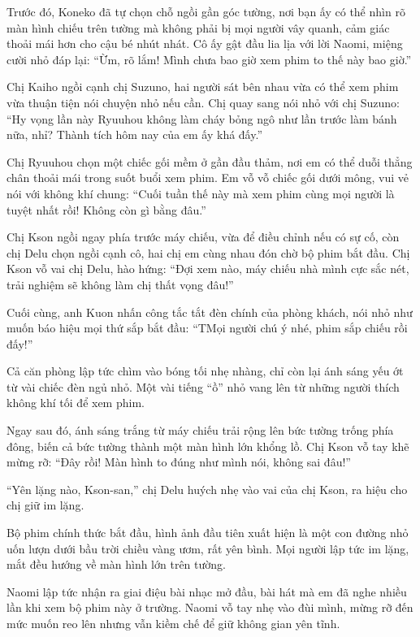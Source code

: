 \documentclass[../main.tex]{subfiles}
\begin{document}
Trước đó, Koneko đã tự chọn chỗ ngồi gần góc tường, nơi bạn ấy có thể nhìn rõ màn hình chiếu trên tường mà không phải bị mọi người vây quanh, cảm giác thoải mái hơn cho cậu bé nhút nhát. Cô ấy gật đầu lia lịa với lời Naomi, miệng cười nhỏ đáp lại: ``Ừm, rõ lắm! Mình chưa bao giờ xem phim to thế này bao giờ.''

Chị Kaiho ngồi cạnh chị Suzuno, hai người sát bên nhau vừa có thể xem phim vừa thuận tiện nói chuyện nhỏ nếu cần. Chị quay sang nói nhỏ với chị Suzuno: ``Hy vọng lần này Ryuuhou không làm cháy bỏng ngô như lần trước làm bánh nữa, nhỉ? Thành tích hôm nay của em ấy khá đấy.''

Chị Ryuuhou chọn một chiếc gối mềm ở gần đầu thảm, nơi em có thể duỗi thẳng chân thoải mái trong suốt buổi xem phim. Em vỗ vỗ chiếc gối dưới mông, vui vẻ nói với không khí chung: ``Cuối tuần thế này mà xem phim cùng mọi người là tuyệt nhất rồi! Không còn gì bằng đâu.''

Chị Kson ngồi ngay phía trước máy chiếu, vừa để điều chỉnh nếu có sự cố, còn chị Delu chọn ngồi cạnh cô, hai chị em cùng nhau đón chờ bộ phim bắt đầu. Chị Kson vỗ vai chị Delu, hào hứng: ``Đợi xem nào, máy chiếu nhà mình cực sắc nét, trải nghiệm sẽ không làm chị thất vọng đâu!''

Cuối cùng, anh Kuon nhấn công tắc tắt đèn chính của phòng khách, nói nhỏ như muốn báo hiệu mọi thứ sắp bắt đầu: ``TMọi người chú ý nhé, phim sắp chiếu rồi đấy!''

Cả căn phòng lập tức chìm vào bóng tối nhẹ nhàng, chỉ còn lại ánh sáng yếu ớt từ vài chiếc đèn ngủ nhỏ. Một vài tiếng ``ồ'' nhỏ vang lên từ những người thích không khí tối để xem phim.

Ngay sau đó, ánh sáng trắng từ máy chiếu trải rộng lên bức tường trống phía đông, biến cả bức tường thành một màn hình lớn khổng lồ. Chị Kson vỗ tay khẽ mừng rỡ: ``Đây rồi! Màn hình to đúng như mình nói, không sai đâu!''

``Yên lặng nào, Kson-san,'' chị Delu huých nhẹ vào vai của chị Kson, ra hiệu cho chị giữ im lặng.

Bộ phim chính thức bắt đầu, hình ảnh đầu tiên xuất hiện là một con đường nhỏ uốn lượn dưới bầu trời chiều vàng ươm, rất yên bình. Mọi người lập tức im lặng, mắt đều hướng về màn hình lớn trên tường.

Naomi lập tức nhận ra giai điệu bài nhạc mở đầu, bài hát mà em đã nghe nhiều lần khi xem bộ phim này ở trường. Naomi vỗ tay nhẹ vào đùi mình, mừng rỡ đến mức muốn reo lên nhưng vẫn kiềm chế để giữ không gian yên tĩnh.
\end{document}

